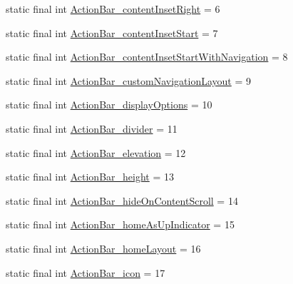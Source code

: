 \begin{DoxyCompactItemize}
\item 
static final int \mbox{\hyperlink{classandroid_1_1support_1_1v7_1_1appcompat_1_1R_1_1styleable_a90365759317426c16fea29e9f94cf640}{Action\+Bar\+\_\+content\+Inset\+Right}} = 6
\item 
static final int \mbox{\hyperlink{classandroid_1_1support_1_1v7_1_1appcompat_1_1R_1_1styleable_a90469b6f87b59c8dce99d18a41473aaa}{Action\+Bar\+\_\+content\+Inset\+Start}} = 7
\item 
static final int \mbox{\hyperlink{classandroid_1_1support_1_1v7_1_1appcompat_1_1R_1_1styleable_a965cd5876f7586c6116d5994c8b78d86}{Action\+Bar\+\_\+content\+Inset\+Start\+With\+Navigation}} = 8
\item 
static final int \mbox{\hyperlink{classandroid_1_1support_1_1v7_1_1appcompat_1_1R_1_1styleable_a479034d663c80b9d43c1e57e05a13c12}{Action\+Bar\+\_\+custom\+Navigation\+Layout}} = 9
\item 
static final int \mbox{\hyperlink{classandroid_1_1support_1_1v7_1_1appcompat_1_1R_1_1styleable_acd03841811ba9e5df62a20bedb147162}{Action\+Bar\+\_\+display\+Options}} = 10
\item 
static final int \mbox{\hyperlink{classandroid_1_1support_1_1v7_1_1appcompat_1_1R_1_1styleable_aa53b0e506f1634ced14e79cf6f24ebee}{Action\+Bar\+\_\+divider}} = 11
\item 
static final int \mbox{\hyperlink{classandroid_1_1support_1_1v7_1_1appcompat_1_1R_1_1styleable_ae947136b9e457a332a3eb65704d7ba19}{Action\+Bar\+\_\+elevation}} = 12
\item 
static final int \mbox{\hyperlink{classandroid_1_1support_1_1v7_1_1appcompat_1_1R_1_1styleable_afcf0c640109d8f4d07f74682d413401f}{Action\+Bar\+\_\+height}} = 13
\item 
static final int \mbox{\hyperlink{classandroid_1_1support_1_1v7_1_1appcompat_1_1R_1_1styleable_aed9672fa4e0265f2aacd9a7d5aeadc72}{Action\+Bar\+\_\+hide\+On\+Content\+Scroll}} = 14
\item 
static final int \mbox{\hyperlink{classandroid_1_1support_1_1v7_1_1appcompat_1_1R_1_1styleable_a618dbd8bf94ca7c36621ee8e90c82fb3}{Action\+Bar\+\_\+home\+As\+Up\+Indicator}} = 15
\item 
static final int \mbox{\hyperlink{classandroid_1_1support_1_1v7_1_1appcompat_1_1R_1_1styleable_abd6457607a6085c532b81e0ed9056f48}{Action\+Bar\+\_\+home\+Layout}} = 16
\item 
static final int \mbox{\hyperlink{classandroid_1_1support_1_1v7_1_1appcompat_1_1R_1_1styleable_a7361ca8600dde9887462a8f6d7d44a0a}{Action\+Bar\+\_\+icon}} = 17

\end{DoxyCompactItemize}
